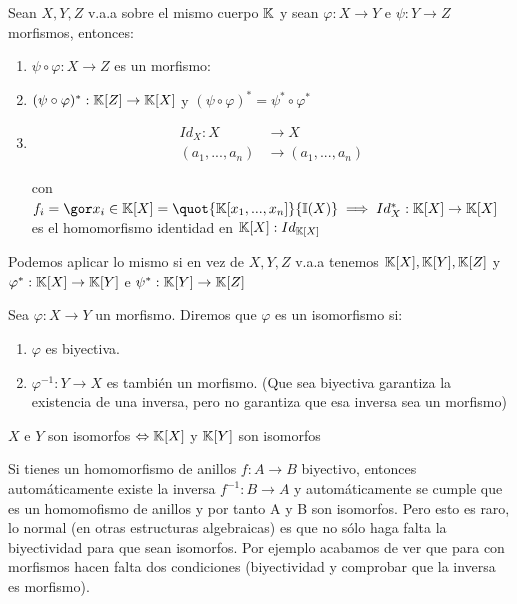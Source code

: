 
\begin{lemma}
	Sean $X,Y,Z$ v.a.a sobre el mismo cuerpo $\mathbb{K}$ y sean $\varphi:X \rightarrow Y$ e $\psi: Y \rightarrow Z$ morfismos, entonces:
	\begin{enumerate}
		\item $\psi \circ \varphi: X \rightarrow Z$ es un morfismo:
		\item $(\psi \circ \varphi)^*: \mathbb{K}[Z] \rightarrow \mathbb{K}[X]$ y $(\psi \circ \varphi)^*=\psi^* \circ \varphi^*$
		\item

		\begin{align*}
		Id_X: X & \rightarrow X \\
		(a_1,...,a_n) & \rightarrow (a_1,...,a_n)
		\end{align*}

		con $f_i=\cls{x_i}\in  \K[X]=\quot{\K[x_1,...,x_n]}{\I(X)} \implies Id_X^*: \K[X] \rightarrow \K[X]$ es el homomorfismo identidad en $\mathbb{K}[X]:Id_{\mathbb{K}[X]}$
	\end{enumerate}
\end{lemma}

\nota Podemos aplicar lo mismo si en vez de $X,Y,Z$ v.a.a tenemos $\mathbb{K}[X], \mathbb{K}[Y], \mathbb{K}[Z]$ y $\varphi^*:\mathbb{K}[X] \rightarrow \mathbb{K}[Y]$ e $\psi^*: \mathbb{K}[Y] \rightarrow \mathbb{K}[Z]$

\begin{defn} 
	Sea $\varphi: X \rightarrow Y$ un morfismo. Diremos que $\varphi$ es un isomorfismo si:
	\begin{enumerate}
		\item $\varphi$ es biyectiva.
		\item $\varphi^{-1}:Y \rightarrow X$ es también un morfismo. (Que sea biyectiva garantiza la existencia de una inversa, pero no garantiza que esa inversa sea un morfismo)
	\end{enumerate}
\end{defn}

\begin{corol}\label{cor:isomorfos}
	$X$ e $Y$ son isomorfos $\Leftrightarrow \mathbb{K}[X]$ y $\mathbb{K}[Y]$ son isomorfos
\end{corol}

\nota Si tienes un homomorfismo de anillos $f:A \rightarrow B$ biyectivo, entonces automáticamente existe la inversa $f^{-1}: B \rightarrow A$ y automáticamente se cumple que es un homomofismo de anillos y por tanto A y B son isomorfos. Pero esto es raro, lo normal (en otras estructuras algebraicas) es que no sólo haga falta la biyectividad para que sean isomorfos. Por ejemplo acabamos de ver que para con morfismos hacen falta dos condiciones (biyectividad y comprobar que la inversa es morfismo).

